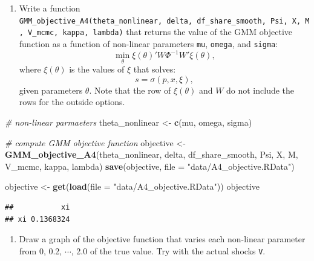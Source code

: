 \documentclass[]{book}
\newenvironment{Shaded}{\begin{snugshade}}{\end{snugshade}}
\newcommand{\KeywordTok}[1]{\textcolor[rgb]{0.13,0.29,0.53}{\textbf{#1}}}
\newcommand{\DataTypeTok}[1]{\textcolor[rgb]{0.13,0.29,0.53}{#1}}
\newcommand{\StringTok}[1]{\textcolor[rgb]{0.31,0.60,0.02}{#1}}
\newcommand{\CommentTok}[1]{\textcolor[rgb]{0.56,0.35,0.01}{\textit{#1}}}
\newcommand{\NormalTok}[1]{#1}
\providecommand{\tightlist}{%
  \setlength{\itemsep}{0pt}\setlength{\parskip}{0pt}}
\begin{document}
\begin{enumerate}
\def\labelenumi{\arabic{enumi}.}
\setcounter{enumi}{10}
\tightlist
\item
  Write a function
  \texttt{GMM\_objective\_A4(theta\_nonlinear,\ delta,\ df\_share\_smooth,\ Psi,\ X,\ M,\ V\_mcmc,\ kappa,\ lambda)}
  that returns the value of the GMM objective function as a function of
  non-linear parameters \texttt{mu}, \texttt{omega}, and \texttt{sigma}:
  \[
  \min_{\theta} \xi(\theta)' W \Phi^{-1} W' \xi(\theta),
  \] where \(\xi(\theta)\) is the values of \(\xi\) that solves: \[
  s = \sigma(p, x, \xi),
  \] given parameters \(\theta\). Note that the row of \(\xi(\theta)\)
  and \(W\) do not include the rows for the outside options.
\end{enumerate}

\begin{Shaded}
\begin{Highlighting}[]
\CommentTok{# non-linear parmaeters}
\NormalTok{theta_nonlinear <-}\StringTok{ }\KeywordTok{c}\NormalTok{(mu, omega, sigma)}
\end{Highlighting}
\end{Shaded}

\begin{Shaded}
\begin{Highlighting}[]
\CommentTok{# compute GMM objective function}
\NormalTok{objective <-}
\StringTok{  }\KeywordTok{GMM_objective_A4}\NormalTok{(theta_nonlinear, delta, df_share_smooth, Psi, }
\NormalTok{                   X, M, V_mcmc, kappa, lambda) }
\KeywordTok{save}\NormalTok{(objective, }\DataTypeTok{file =} \StringTok{"data/A4_objective.RData"}\NormalTok{)}
\end{Highlighting}
\end{Shaded}

\begin{Shaded}
\begin{Highlighting}[]
\NormalTok{objective <-}\StringTok{ }\KeywordTok{get}\NormalTok{(}\KeywordTok{load}\NormalTok{(}\DataTypeTok{file =} \StringTok{"data/A4_objective.RData"}\NormalTok{))}
\NormalTok{objective}
\end{Highlighting}
\end{Shaded}

\begin{verbatim}
##           xi
## xi 0.1368324
\end{verbatim}

\begin{enumerate}
\def\labelenumi{\arabic{enumi}.}
\setcounter{enumi}{11}
\tightlist
\item
  Draw a graph of the objective function that varies each non-linear
  parameter from 0, 0.2, \(\cdots\), 2.0 of the true value. Try with the
  actual shocks \texttt{V}.
\end{enumerate}
\end{document}
